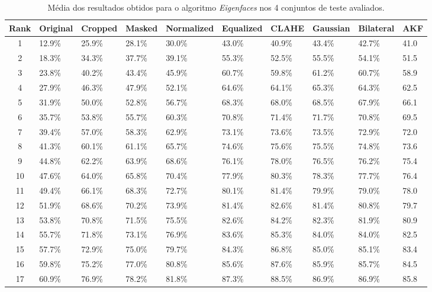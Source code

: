 \begin{table}[h]
    \begin{center}
    \caption{Média dos resultados obtidos para o algoritmo \textit{Eigenfaces} nos 4 conjuntos de teste avaliados.}	
	\begin{tabular}{c|p{1.2cm}p{1.1cm}p{1.1cm}p{1.7cm}p{1.5cm}p{1.2cm}p{1.2cm}p{1.2cm}p{1.2cm}}
	Rank & Original & Cropped & Masked & Normalized & Equalized & CLAHE & Gaussian & Bilateral & AKF \\ 
	\hline\hline
	1 & 12.9\% & 25.9\% & 28.1\% & 30.0\% & 43.0\% & 40.9\% & 43.4\% & 42.7\% & 41.0 \\ 
	2 & 18.3\% & 34.3\% & 37.7\% & 39.1\% & 55.3\% & 52.5\% & 55.5\% & 54.1\% & 51.5 \\ 
	3 & 23.8\% & 40.2\% & 43.4\% & 45.9\% & 60.7\% & 59.8\% & 61.2\% & 60.7\% & 58.9 \\ 
	4 & 27.9\% & 46.3\% & 47.9\% & 52.1\% & 64.6\% & 64.1\% & 65.3\% & 64.3\% & 62.5 \\ 
	5 & 31.9\% & 50.0\% & 52.8\% & 56.7\% & 68.3\% & 68.0\% & 68.5\% & 67.9\% & 66.1 \\ 
	6 & 35.7\% & 53.8\% & 55.7\% & 60.3\% & 70.8\% & 71.4\% & 71.7\% & 70.8\% & 69.5 \\ 
	7 & 39.4\% & 57.0\% & 58.3\% & 62.9\% & 73.1\% & 73.6\% & 73.5\% & 72.9\% & 72.0 \\ 
	8 & 41.3\% & 60.1\% & 61.1\% & 65.7\% & 74.6\% & 75.6\% & 75.5\% & 74.8\% & 73.6 \\ 
	9 & 44.8\% & 62.2\% & 63.9\% & 68.6\% & 76.1\% & 78.0\% & 76.5\% & 76.2\% & 75.4 \\ 
	10 & 47.6\% & 64.0\% & 65.8\% & 70.4\% & 77.9\% & 80.3\% & 78.3\% & 77.7\% & 76.4 \\ 
	11 & 49.4\% & 66.1\% & 68.3\% & 72.7\% & 80.1\% & 81.4\% & 79.9\% & 79.0\% & 78.0 \\ 
	12 & 51.9\% & 68.6\% & 70.2\% & 73.9\% & 81.4\% & 82.6\% & 81.4\% & 80.8\% & 79.7 \\ 
	13 & 53.8\% & 70.8\% & 71.5\% & 75.5\% & 82.6\% & 84.2\% & 82.3\% & 81.9\% & 80.9 \\ 
	14 & 55.7\% & 71.8\% & 73.1\% & 76.9\% & 83.6\% & 85.3\% & 84.0\% & 84.0\% & 82.5 \\ 
	15 & 57.7\% & 72.9\% & 75.0\% & 79.7\% & 84.3\% & 86.8\% & 85.0\% & 85.1\% & 83.4 \\ 
	16 & 59.8\% & 75.2\% & 77.0\% & 80.8\% & 85.6\% & 87.6\% & 85.9\% & 85.7\% & 84.5 \\ 
	17 & 60.9\% & 76.9\% & 78.2\% & 81.8\% & 87.3\% & 88.5\% & 86.9\% & 86.9\% & 85.8 \\ 

\end{tabular}
\end{center}
\end{table}
